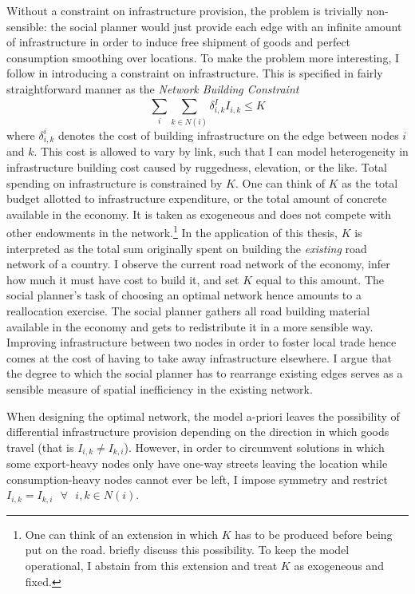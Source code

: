 \documentclass[11pt, oneside]{article}   	%
\begin{document}
Without a constraint on infrastructure provision, the problem is trivially non-sensible: the social planner would just provide each edge with an infinite amount of infrastructure in order to induce free shipment of goods and perfect consumption smoothing over locations. To make the problem more interesting, I follow \citeauthor{fajgelbaum_optimal_2017} in introducing a constraint on infrastructure. This is specified in fairly straightforward manner as the \emph{Network Building Constraint}
\begin{equation}
  \sum_{i}^{}\sum_{k\in N(i)}^{}\delta^{I}_{i,k}I_{i,k} \leq K
  \label{eq:network_building}
\end{equation}
where $\delta^{i}_{i,k}$ denotes the cost of building infrastructure on the edge between nodes $i$ and $k$. This cost is allowed to vary by link, such that I can model heterogeneity in infrastructure building cost caused by ruggedness, elevation, or the like. Total spending on infrastructure is constrained by $K$. One can think of $K$ as the total budget allotted to infrastructure expenditure, or the total amount of concrete available in the economy. It is taken as exogeneous and does not compete with other endowments in the network.\footnote{One can think of an extension in which $K$ has to be produced before being put on the road. \citeauthor{fajgelbaum_optimal_2017} briefly discuss this possibility. To keep the model operational, I abstain from this extension and treat $K$ as exogeneous and fixed.} In the application of this thesis, $K$ is interpreted as the total sum originally spent on building the \emph{existing} road network of a country. I observe the current road network of the economy, infer how much it must have cost to build it, and set $K$ equal to this amount. The social planner's task of choosing an optimal network hence amounts to a reallocation exercise. The social planner gathers all road building material available in the economy and gets to redistribute it in a more sensible way. Improving infrastructure between two nodes in order to foster local trade hence comes at the cost of having to take away infrastructure elsewhere. I argue that the degree to which the social planner has to rearrange existing edges serves as a sensible measure of spatial inefficiency in the existing network.

When designing the optimal network, the model a-priori leaves the possibility of differential infrastructure provision depending on the direction in which goods travel (that is $I_{i,k} \neq I_{k,i}$). However, in order to circumvent solutions in which some export-heavy nodes only have one-way streets leaving the location while consumption-heavy nodes cannot ever be left, I impose symmetry and restrict $I_{i,k} = I_{k,i} \textrm{ } \forall \textrm{ } i,k\in N(i)$.
\end{document}
